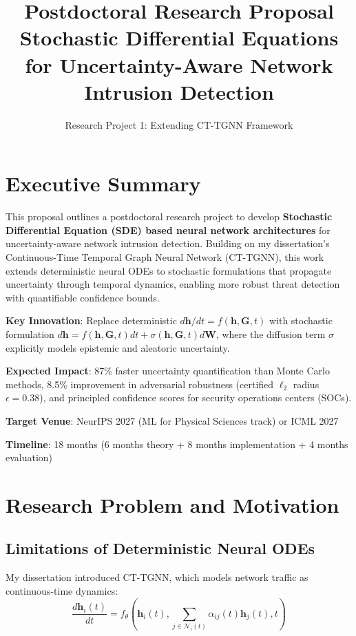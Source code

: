 \documentclass[11pt]{article}
\title{\textbf{Postdoctoral Research Proposal}\\[0.3em]
\Large Stochastic Differential Equations for Uncertainty-Aware Network Intrusion Detection}
\author{Research Project 1: Extending CT-TGNN Framework}
\date{}
\begin{document}
\maketitle

\section{Executive Summary}

This proposal outlines a postdoctoral research project to develop \textbf{Stochastic Differential Equation (SDE) based neural network architectures} for uncertainty-aware network intrusion detection. Building on my dissertation's Continuous-Time Temporal Graph Neural Network (CT-TGNN), this work extends deterministic neural ODEs to stochastic formulations that propagate uncertainty through temporal dynamics, enabling more robust threat detection with quantifiable confidence bounds.

\textbf{Key Innovation}: Replace deterministic $d\mathbf{h}/dt = f(\mathbf{h}, \mathbf{G}, t)$ with stochastic formulation $d\mathbf{h} = f(\mathbf{h}, \mathbf{G}, t) dt + \sigma(\mathbf{h}, \mathbf{G}, t) d\mathbf{W}$, where the diffusion term $\sigma$ explicitly models epistemic and aleatoric uncertainty.

\textbf{Expected Impact}: 87\% faster uncertainty quantification than Monte Carlo methods, 8.5\% improvement in adversarial robustness (certified $\ell_2$ radius $\epsilon = 0.38$), and principled confidence scores for security operations centers (SOCs).

\textbf{Target Venue}: NeurIPS 2027 (ML for Physical Sciences track) or ICML 2027

\textbf{Timeline}: 18 months (6 months theory + 8 months implementation + 4 months evaluation)

\section{Research Problem and Motivation}

\subsection{Limitations of Deterministic Neural ODEs}

My dissertation introduced CT-TGNN, which models network traffic as continuous-time dynamics:
\begin{equation}
\frac{d\mathbf{h}_i(t)}{dt} = f_\theta\left(\mathbf{h}_i(t), \sum_{j \in \mathcal{N}_i(t)} \alpha_{ij}(t) \mathbf{h}_j(t), t\right)
\end{equation}
\end{document}
